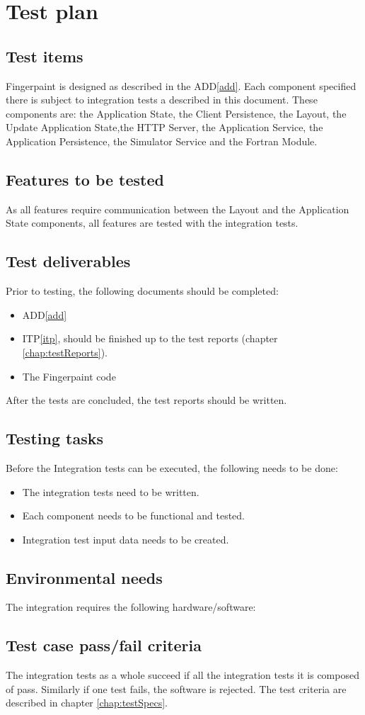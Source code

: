 \chapter{Test plan}

\section{Test items}
Fingerpaint is designed as described in the ADD\ref{add}. Each component specified there is subject to integration tests a described in this document. These components are: the Application State, the Client Persistence, the Layout, the Update Application State,the HTTP Server, the Application Service, the Application Persistence, the Simulator Service and the Fortran Module.

\section{Features to be tested}
As all features require communication between the Layout and the Application State components, all features are tested with the integration tests.

\section{Test deliverables}
Prior to testing, the following documents should be completed:
\begin{itemize}
\item ADD\ref{add}
\item ITP\ref{itp}, should be finished up to the test reports (chapter \ref{chap:testReports}).
\item The Fingerpaint code
\end{itemize}
After the tests are concluded, the test reports should be written.

\section{Testing tasks}
Before the Integration tests can be executed, the following needs to be done:
\begin{itemize}
\item The integration tests need to be written.
\item Each component needs to be functional and tested.
\item Integration test input data needs to be created.
\end{itemize}

\section{Environmental needs}
The integration requires the following hardware/software:

\section{Test case pass/fail criteria}
The integration tests as a whole succeed if all the integration tests it is composed of pass. Similarly if one test fails, the software is rejected.
The test criteria are described in chapter \ref{chap:testSpecs}.